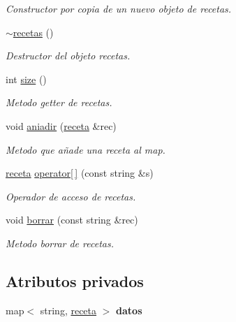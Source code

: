 \begin{DoxyCompactItemize}
\begin{DoxyCompactList}\small\item\em Constructor por copia de un nuevo objeto de recetas. \end{DoxyCompactList}\item 
\hyperlink{classrecetas_a2f1ebaeabb8cc344cb7af3667f99645c}{$\sim$recetas} ()
\begin{DoxyCompactList}\small\item\em Destructor del objeto recetas. \end{DoxyCompactList}\item 
int \hyperlink{classrecetas_a9d208c157f2dc674b48e11d359de911a}{size} ()
\begin{DoxyCompactList}\small\item\em Metodo getter de recetas. \end{DoxyCompactList}\item 
void \hyperlink{classrecetas_af55a0d5e9394710cf6390fa67f38b49a}{aniadir} (\hyperlink{classreceta}{receta} \&rec)
\begin{DoxyCompactList}\small\item\em Metodo que añade una receta al map. \end{DoxyCompactList}\item 
\hyperlink{classreceta}{receta} \hyperlink{classrecetas_aed14cb0dd493f758dfb3e20efbeead12}{operator\mbox{[}$\,$\mbox{]}} (const string \&s)
\begin{DoxyCompactList}\small\item\em Operador de acceso de recetas. \end{DoxyCompactList}\item 
void \hyperlink{classrecetas_a52f721a2505cd731718bec3c2231cce7}{borrar} (const string \&rec)
\begin{DoxyCompactList}\small\item\em Metodo borrar de recetas. \end{DoxyCompactList}\end{DoxyCompactItemize}
\subsection*{Atributos privados}
\begin{DoxyCompactItemize}
\item 
\mbox{\label{classrecetas_aefd3481b61db689d1aa2762004eea715}} 
map$<$ string, \hyperlink{classreceta}{receta} $>$ {\bfseries datos}
\end{DoxyCompactItemize}
